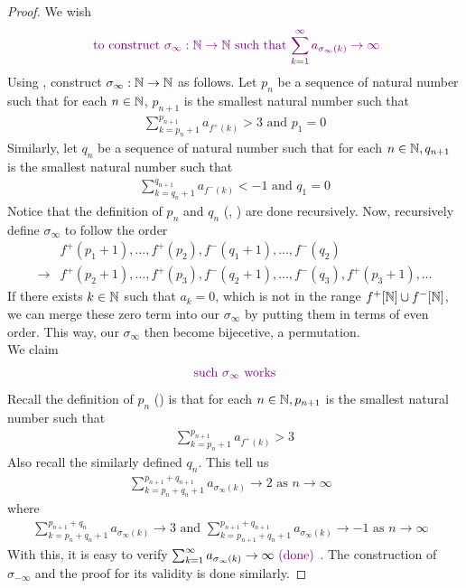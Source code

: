\documentclass{report}
\begin{document}
\begin{proof}
We wish
\begin{align*}
\textcolor{violet}{\text{ to construct $\sigma_{\infty}:\mathbb{N}\rightarrow \mathbb{N}$ such that  $\sum_{k=1}^\infty a_{\sigma_{\infty}(k)}\to\infty$}}
\end{align*}
Using , construct $\sigma_{\infty}:\mathbb{N}\rightarrow \mathbb{N}$ as follows. Let $p_n$ be a sequence of natural number such that for each $n\in\mathbb{N}$, $p_{n+1}$ is the smallest natural number such that 
\begin{align}
\label{e10}
\sum_{k=p_n+1}^{p_{n+1}} a_{f^+(k)}> 3\text{ and }p_1=0
\end{align}
Similarly, let $q_n$ be a sequence of natural number such that for each $n\in\mathbb{N},q_{n+1}$ is the smallest natural number such that 
\begin{align}
\label{e11}
\sum_{k=q_n+1}^{q_{n+1}}a_{f^-(k)}<-1\text{ and }q_1=0
\end{align}
Notice that the definition of $p_n$ and  $q_n$ (, ) are done recursively. Now, recursively define $\sigma_{\infty}$ to follow the order
\begin{align*}
&f^+(p_1+1),\dots,f^+(p_2),f^-(q_1+1),\dots ,f^-(q_2)\\
  \longrightarrow &  f^+(p_2+1),\dots ,f^+(p_3),f^-(q_2+1),\dots ,f^-(q_3),f^+(p_3+1),\dots 
\end{align*}
If there exists  $k\in\mathbb{N}$ such that $a_k=0$, which is not in the range $f^+[\mathbb{N}]\cup f^-[\mathbb{N}]$, we can merge these zero term into our $\sigma_{\infty}$ by putting them in terms of even order. This way, our $\sigma_{\infty}$ then become bijecetive, a permutation.\\

We claim 
\begin{align*}
  \textcolor{violet}{\text{ such }\sigma_{\infty}\text{ works }}
\end{align*}
Recall the definition of $p_n$ () is that for each  $n\in\mathbb{N},p_{n+1}$ is the smallest natural number such that
\begin{align*}
\sum_{k=p_{n}+1}^{p_{n+1}}a_{f^+(k)}>3 
\end{align*}
Also recall the similarly defined $q_n$. This tell us 
\begin{align*}
\sum_{k=p_n+q_n+1}^{p_{n+1}+q_{n+1}}a_{\sigma_{\infty}(k)}\to 2\text{ as $n\to \infty$ }
\end{align*}
where 
\begin{align*}
\sum_{k=p_n+q_n+1}^{p_{n+1}+q_n}a_{\sigma_\infty(k)}\to 3\text{ and }\sum_{k=p_{n+1}+q_n+1}^{p_{n+1}+q_{n+1}}a_{\sigma_\infty(k)}\to -1\text{ as $n \to \infty$ }
\end{align*}
With this, it is easy to verify $\sum_{k=1}^\infty a_{\sigma_{\infty}(k)} \to \infty\textcolor{violet}{\text{ (done) }}$. The construction of $\sigma_{-\infty}$ and the proof for its validity is done similarly. 
\end{proof}
\end{document}
